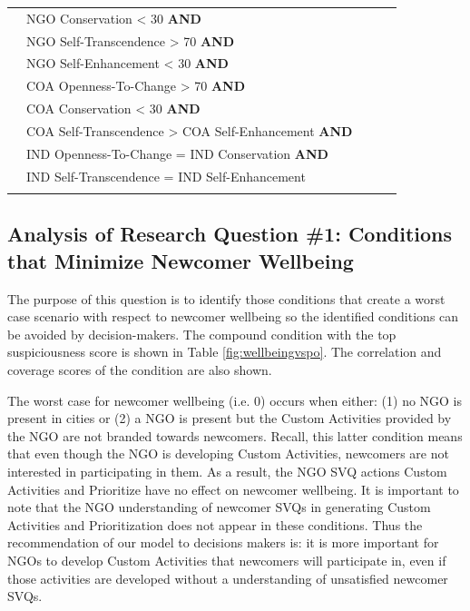 \documentclass{scspaperproc}
\theoremstyle{scsthe}
\begin{document}
\begin{table}[ht]
\begin{center}
{\begin{tabular}{|l l l l l |}
                                                                      & NGO Conservation < 30 \textbf{AND} & & & \\ 
                                                                      & NGO Self-Transcendence > 70 \textbf{AND} & & & \\ 
                                                                      & NGO Self-Enhancement < 30 \textbf{AND} & & & \\ 
                                                                      & COA Openness-To-Change > 70 \textbf{AND} & & & \\         
                                                                      & COA Conservation < 30 \textbf{AND} & & & \\ 
                                                                      & COA Self-Transcendence > COA Self-Enhancement \textbf{AND} & & & \\ 
                                                                      & IND Openness-To-Change = IND Conservation \textbf{AND} & & & \\         
                                                                      & IND Self-Transcendence =  IND Self-Enhancement& & & \\ 
                                                                       & & & & \\  
\hline
\end{tabular}}
\end{center}
\end{table}
 
\subsection{Analysis of Research Question \#1: Conditions that Minimize Newcomer Wellbeing}
The purpose of this question is to identify those conditions that create a worst case scenario with respect to newcomer wellbeing so the identified conditions can be avoided by decision-makers. The compound condition with the top suspiciousness score is shown in Table \ref{fig:wellbeingvspo}. The correlation and coverage scores of the condition are also shown. 

The worst case for newcomer wellbeing (i.e. 0) occurs when either: (1) no NGO is present in cities or (2) a NGO is present but the Custom Activities provided by the NGO are not branded towards newcomers. Recall, this latter condition means that even though the NGO is developing Custom Activities, newcomers are not interested in participating in them. As a result, the NGO SVQ actions Custom Activities and Prioritize have no effect on newcomer wellbeing. It is important to note that the NGO understanding of newcomer SVQs in generating Custom Activities and Prioritization does not appear in these conditions. Thus the recommendation of our model to decisions makers is: it is more important for NGOs to develop Custom Activities that newcomers will participate in, even if those activities are developed without a understanding of unsatisfied newcomer SVQs. 
\end{document}
